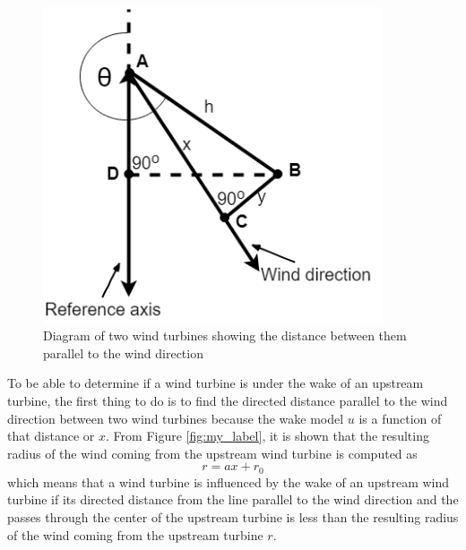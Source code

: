     \begin{figure}[h]
        \centering
        \includegraphics[width=100mm]{Figures/comp1.png}
        \caption{Diagram of two wind turbines showing the distance between them parallel to the wind direction}
        \label{comp1}
    \end{figure}
    
    To be able to determine if a wind turbine is under the wake of an upstream turbine, the first thing to do is to find the directed distance parallel to the wind direction between two wind turbines because the wake model $u$ is a function of that distance or $x$. From Figure \ref{fig:my_label}, it is shown that the resulting radius of the wind coming from the upstream wind turbine is computed as
    \begin{equation} \label{rValue}
        r=ax+r_0
    \end{equation}
    which means that a wind turbine is influenced by the wake of an upstream wind turbine if its directed distance from the line parallel to the wind direction and the passes through the center of the upstream turbine is less than the resulting radius of the wind coming from the upstream turbine $r$.
    
